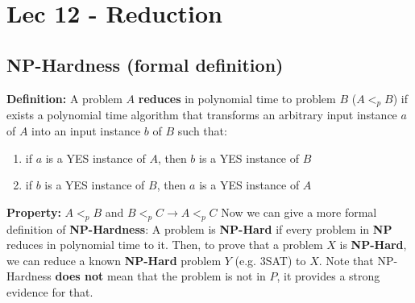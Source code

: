 \chapter{Lec 12 - Reduction}

\section{NP-Hardness (formal definition)}
\textbf{Definition:}\newline
A problem $A$ \textbf{reduces} in polynomial time to problem $B$ ($A <_p B$) if exists a polynomial time algorithm that transforms an arbitrary input instance $a$ of $A$ into an input instance $b$ of $B$ such that:
\begin{enumerate}
    \item if $a$ is a YES instance of $A$, then $b$ is a YES instance of $B$
    
    \item if $b$ is a YES instance of $B$, then $a$ is a YES instance of $A$ 
\end{enumerate}
\textbf{Property:}\newline
$A <_p B$ and $B <_p C \rightarrow A <_p C$\newline\newline
Now we can give a more formal definition of \textbf{NP-Hardness}:\newline
A problem is \textbf{NP-Hard} if every problem in \textbf{NP} reduces in polynomial time to it.\newline\newline
Then, to prove that a problem $X$ is \textbf{NP-Hard}, we can reduce a known \textbf{NP-Hard} problem $Y$ (e.g. 3SAT) to $X$. Note that NP-Hardness \textbf{does not} mean that the problem is not in $P$, it provides a strong evidence for that.

